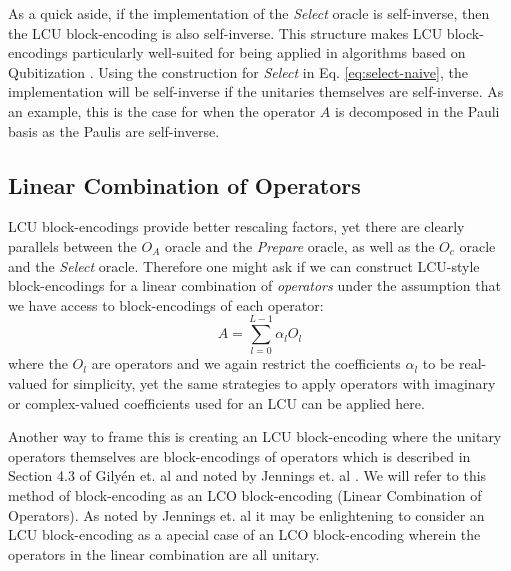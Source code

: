 As a quick aside, if the implementation of the \textit{Select} oracle is self-inverse, then the LCU block-encoding is also self-inverse.
This structure makes LCU block-encodings particularly well-suited for being applied in algorithms based on Qubitization \cite{low2019hamiltonian}.
Using the construction for \textit{Select} in Eq. \ref{eq:select-naive}, the implementation will be self-inverse if the unitaries themselves are self-inverse.
As an example, this is the case for when the operator $A$ is decomposed in the Pauli basis as the Paulis are self-inverse. 

\subsection{Linear Combination of Operators}
\label{subsec:lco}

LCU block-encodings provide better rescaling factors, yet there are clearly parallels between the $O_A$ oracle and the \textit{Prepare} oracle, as well as the $O_c$ oracle and the \textit{Select} oracle.
Therefore one might ask if we can construct LCU-style block-encodings for a linear combination of \textit{operators} under the assumption that we have access to block-encodings of each operator:
\begin{equation}
    \label{eq:lco}
    A = \sum_{l=0}^{L-1} \alpha_l O_l
\end{equation}
where the $O_l$ are operators and we again restrict the coefficients $\alpha_l$ to be real-valued for simplicity, yet the same strategies to apply operators with imaginary or complex-valued coefficients used for an LCU can be applied here.

Another way to frame this is creating an LCU block-encoding where the unitary operators themselves are block-encodings of operators which is described in Section 4.3 of Gilyén et. al \cite{gilyen2019quantum} and noted by Jennings et. al \cite{jennings2023efficient}.
We will refer to this method of block-encoding as an LCO block-encoding (Linear Combination of Operators).
As noted by Jennings et. al \cite{jennings2023efficient} it may be enlightening to consider an LCU block-encoding as a apecial case of an LCO block-encoding wherein the operators in the linear combination are all unitary.

